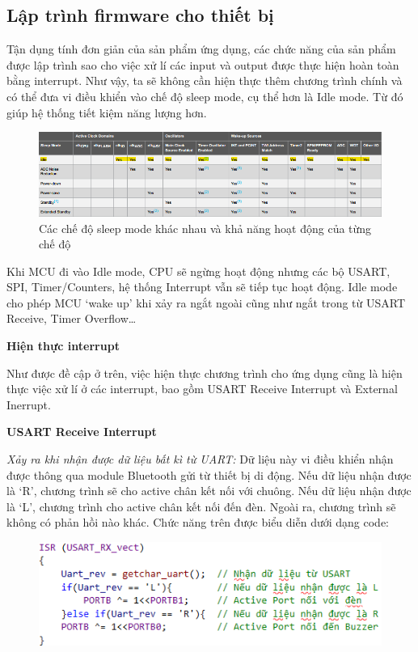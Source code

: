 \subsection{Lập trình firmware cho thiết bị}

Tận dụng tính đơn giản của sản phẩm ứng dụng, các chức năng của sản phẩm được lập trình sao cho việc xử lí các input và output được thực hiện hoàn toàn bằng interrupt. Như vậy, ta sẽ không cần hiện thực thêm chương trình chính và có thể đưa vi điều khiển vào chế độ sleep mode, cụ thể hơn là Idle mode. Từ đó giúp hệ thống tiết kiệm năng lượng hơn.

	\begin{figure}[H]
		\centering    
		\includegraphics[width=1\textwidth]{sleep}
		\caption[Các chế độ sleep mode khác nhau và khả năng hoạt động của từng chế độ]{Các chế độ sleep mode khác nhau và khả năng hoạt động của từng chế độ}
		\label{fig: sleep}
	\end{figure}
		
Khi MCU đi vào Idle mode, CPU sẽ ngừng hoạt động nhưng các bộ USART, SPI, Timer/Counters, hệ thống Interrupt vẫn sẽ tiếp tục hoạt động.
Idle mode cho phép MCU ‘wake up’ khi xảy ra ngắt ngoài cũng như ngắt trong từ USART Receive, Timer Overflow…

\textbf{Hiện thực interrupt}

Như được đề cập ở trên, việc hiện thực chương trình cho ứng dụng cũng là hiện thực việc xử lí ở các interrupt, bao gồm USART Receive Interrupt và External Inerrupt.

\textbf{USART Receive Interrupt}

\textit{Xảy ra khi nhận được dữ liệu bất kì từ UART:} Dữ liệu này vi điều khiển nhận được thông qua module Bluetooth gửi từ thiết bị di động. Nếu dữ liệu nhận được là ‘R’, chương trình sẽ cho active chân kết nối với chuông. Nếu dữ liệu nhận được là ‘L’, chương trình cho active chân kết nối đến đèn. Ngoài ra, chương trình sẽ không có phản hồi nào khác. Chức năng trên được biểu diễn dưới dạng code:
	\begin{figure}[H]
		\centering    
		\includegraphics[width=1\textwidth]{int}
		\label{fig: int}
	\end{figure}
	

